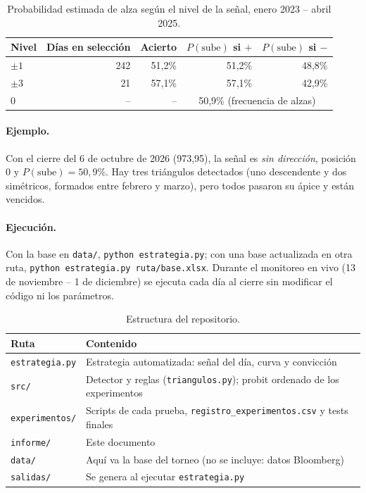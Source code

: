 \documentclass[10pt,a4paper]{article}
\begin{document}
\begin{table}[htbp]\centering\small
\begin{tabular}{@{}lrrrr@{}}
\toprule
Nivel & Días en selección & Acierto & $P(\text{sube})$ si $+$ & $P(\text{sube})$ si $-$ \\
\midrule
$\pm1$ & 242 & 51{,}2\% & 51{,}2\% & 48{,}8\% \\
$\pm3$ & 21  & 57{,}1\% & 57{,}1\% & 42{,}9\% \\
0      & --  & --       & \multicolumn{2}{c}{50{,}9\% (frecuencia de alzas)} \\
\bottomrule
\end{tabular}
\caption{Probabilidad estimada de alza según el nivel de la señal, enero 2023 --
abril 2025.}\label{tab:prob}
\end{table}

\paragraph{Ejemplo.} Con el cierre del 6 de octubre de 2026 (973,95), la señal es
\emph{sin dirección}, posición 0 y $P(\text{sube})=50{,}9\%$. Hay tres triángulos
detectados (uno descendente y dos simétricos, formados entre febrero y marzo), pero
todos pasaron su ápice y están vencidos.

\paragraph{Ejecución.} Con la base en \texttt{data/}, \texttt{python estrategia.py};
con una base actualizada en otra ruta, \texttt{python estrategia.py
ruta/base.xlsx}. Durante el monitoreo en vivo (13 de noviembre -- 1 de diciembre)
se ejecuta cada día al cierre sin modificar el código ni los parámetros.

\begin{table}[htbp]\centering\small
\begin{tabular}{@{}ll@{}}
\toprule
Ruta & Contenido \\
\midrule
\texttt{estrategia.py}  & Estrategia automatizada: señal del día, curva y convicción \\
\texttt{src/}           & Detector y reglas (\texttt{triangulos.py}); probit ordenado de los experimentos \\
\texttt{experimentos/}  & Scripts de cada prueba, \texttt{registro\_experimentos.csv} y tests finales \\
\texttt{informe/}       & Este documento \\
\texttt{data/}          & Aquí va la base del torneo (no se incluye: datos Bloomberg) \\
\texttt{salidas/}       & Se genera al ejecutar \texttt{estrategia.py} \\
\bottomrule
\end{tabular}
\caption{Estructura del repositorio.}
\end{table}
\end{document}
